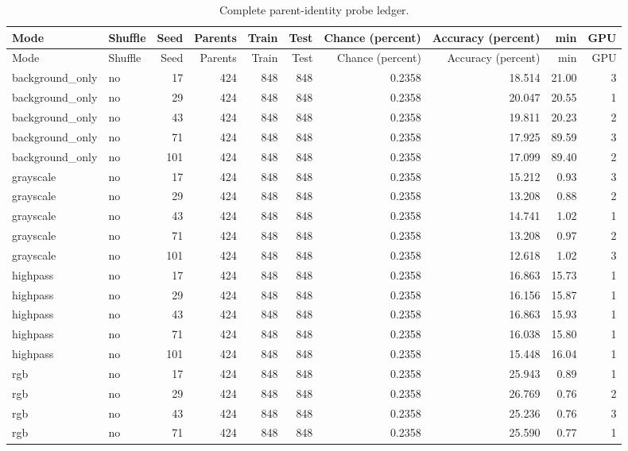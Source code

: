 \begin{longtable}{p{2.4cm}p{1.0cm}rrrrrrrr}
\caption{Complete parent-identity probe ledger.}\label{s1:tab:all-probe-runs}\\
\toprule
Mode & Shuffle & Seed & Parents & Train & Test & Chance (percent) & Accuracy (percent) & min & GPU \\
\midrule
\endfirsthead
\toprule
Mode & Shuffle & Seed & Parents & Train & Test & Chance (percent) & Accuracy (percent) & min & GPU \\
\midrule
\endhead
\bottomrule
\endfoot
background\_only & no & 17 & 424 & 848 & 848 & 0.2358 & 18.514 & 21.00 & 3 \\ 
background\_only & no & 29 & 424 & 848 & 848 & 0.2358 & 20.047 & 20.55 & 1 \\ 
background\_only & no & 43 & 424 & 848 & 848 & 0.2358 & 19.811 & 20.23 & 2 \\ 
background\_only & no & 71 & 424 & 848 & 848 & 0.2358 & 17.925 & 89.59 & 3 \\ 
background\_only & no & 101 & 424 & 848 & 848 & 0.2358 & 17.099 & 89.40 & 2 \\ 
grayscale & no & 17 & 424 & 848 & 848 & 0.2358 & 15.212 & 0.93 & 3 \\ 
grayscale & no & 29 & 424 & 848 & 848 & 0.2358 & 13.208 & 0.88 & 2 \\ 
grayscale & no & 43 & 424 & 848 & 848 & 0.2358 & 14.741 & 1.02 & 1 \\ 
grayscale & no & 71 & 424 & 848 & 848 & 0.2358 & 13.208 & 0.97 & 2 \\ 
grayscale & no & 101 & 424 & 848 & 848 & 0.2358 & 12.618 & 1.02 & 3 \\ 
highpass & no & 17 & 424 & 848 & 848 & 0.2358 & 16.863 & 15.73 & 1 \\ 
highpass & no & 29 & 424 & 848 & 848 & 0.2358 & 16.156 & 15.87 & 1 \\ 
highpass & no & 43 & 424 & 848 & 848 & 0.2358 & 16.863 & 15.93 & 1 \\ 
highpass & no & 71 & 424 & 848 & 848 & 0.2358 & 16.038 & 15.80 & 1 \\ 
highpass & no & 101 & 424 & 848 & 848 & 0.2358 & 15.448 & 16.04 & 1 \\ 
rgb & no & 17 & 424 & 848 & 848 & 0.2358 & 25.943 & 0.89 & 1 \\ 
rgb & no & 29 & 424 & 848 & 848 & 0.2358 & 26.769 & 0.76 & 2 \\ 
rgb & no & 43 & 424 & 848 & 848 & 0.2358 & 25.236 & 0.76 & 3 \\ 
rgb & no & 71 & 424 & 848 & 848 & 0.2358 & 25.590 & 0.77 & 1 \\ 

\end{longtable}
